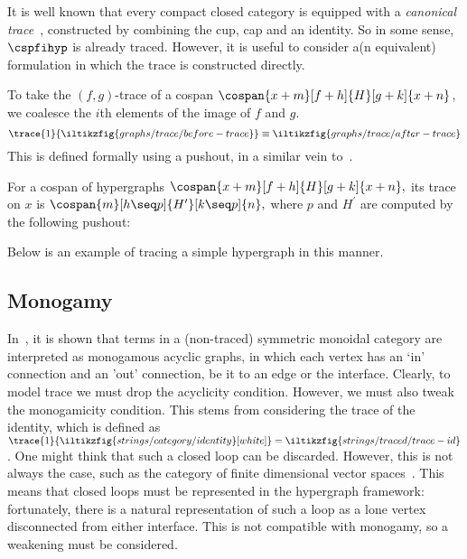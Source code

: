 It is well known that every compact closed category is equipped with a \emph{canonical trace}~\cite{joyal1996traced}, constructed by combining the cup, cap and an identity.
So in some sense, \(\cspfihyp\) is already traced.
However, it is useful to consider a(n equivalent) formulation in which the trace is constructed directly.

To take the \((f,g)\)-trace of a cospan \(\cospan{x+m}[f+h]{H}[g+k]{x+n}\), we coalesce the \(i\)th elements of the image of \(f\) and \(g\).
\[
    \trace{1}{\iltikzfig{graphs/trace/before-trace}}
    \equiv
    \iltikzfig{graphs/trace/after-trace}
\]
This is defined formally using a pushout, in a similar vein
to~\cite{dixon2013opengraphs}.

\begin{definition}
    For a cospan of hypergraphs \(
        \cospan{x+m}[f+h]{H}[g+k]{x+n},
    \) its trace on \(x\) is \(
        \cospan{m}[h \seq p]{H^\prime}[k \seq p]{n},
    \) where \(p\) and \(H^\prime\) are computed by the following pushout:
    \begin{center}
    \end{center}
\end{definition}

\begin{example}
    Below is an example of tracing a simple hypergraph in this manner.
    \begin{center}
    \end{center}
\end{example}

\subsection{Monogamy}

In~\cite{bonchi2016rewriting}, it is shown that terms in a (non-traced)
symmetric monoidal category are interpreted as monogamous acyclic graphs, in
which each vertex has an `in' connection and an 'out' connection, be it to an
edge or the interface.
Clearly, to model trace we must drop the acyclicity condition.
However, we must also tweak the monogamicity condition.
This stems from considering the trace of the identity, which is defined as
\(
    \trace{1}{\iltikzfig{strings/category/identity}[white]}
    =
    \iltikzfig{strings/traced/trace-id}
\).
One might think that such a closed loop can be discarded.
However, this is not always the case, such as the category of finite dimensional
vector spaces~\cite[Sec. 6.1]{hasegawa1997recursion}.
This means that closed loops must be represented in the hypergraph framework:
fortunately, there is a natural representation of such a loop as a lone vertex
disconnected from either interface.
This is not compatible with monogamy, so a weakening must be considered.

